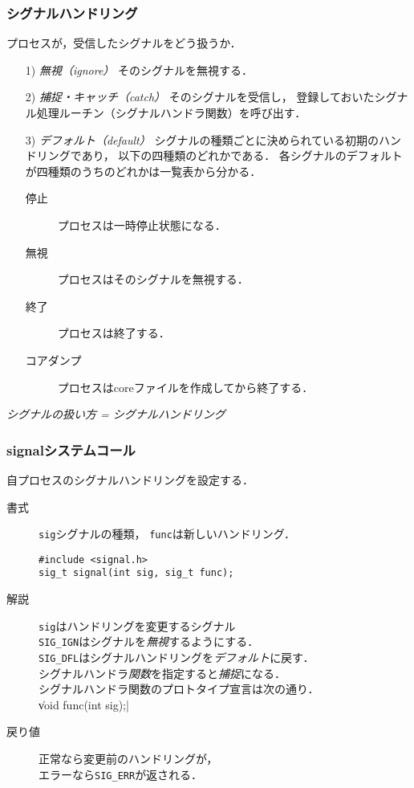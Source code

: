 \documentclass{beamer}                 %
\begin{document}
\begin{frame}[fragile]
  \frametitle{シグナルハンドリング}
  プロセスが，受信したシグナルをどう扱うか．

  \begin{enumerate}
  \item[1)] \emph{無視（ignore）}
    そのシグナルを無視する．
  \item[2)] \emph{捕捉・キャッチ（catch）}
    そのシグナルを受信し，
    登録しておいたシグナル処理ルーチン（シグナルハンドラ関数）を呼び出す．
  \item[3)] \emph{デフォルト（default）}
    シグナルの種類ごとに決められている初期のハンドリングであり，
    以下の四種類のどれかである．
    各シグナルのデフォルトが四種類のうちのどれかは一覧表から分かる．
    \begin{description}
    \item[停止] プロセスは一時停止状態になる．
    \item[無視] プロセスはそのシグナルを無視する．
    \item[終了] プロセスは終了する．
    \item[コアダンプ] プロセスはcoreファイルを作成してから終了する．
  \end{description}
  \end{enumerate}

  \begin{center}
  \emph{\Large{シグナルの扱い方 = シグナルハンドリング}}
  \end{center}

\end{frame}

\begin{frame}[fragile]
  \frametitle{signalシステムコール}
  自プロセスのシグナルハンドリングを設定する．
  
  \begin{description}
  \item[書式] \texttt{sig}シグナルの種類，
    \texttt{func}は新しいハンドリング．

\begin{verbatim}
#include <signal.h>
sig_t signal(int sig, sig_t func);
\end{verbatim}

  \item[解説] \texttt{sig}はハンドリングを変更するシグナル\\
    \texttt{SIG\_IGN}はシグナルを\emph{無視}するようにする．\\
    \texttt{SIG\_DFL}はシグナルハンドリングを\emph{デフォルト}に戻す．\\
    シグナルハンドラ\emph{関数}を指定すると\emph{捕捉}になる．\\
    シグナルハンドラ関数のプロトタイプ宣言は次の通り．\\
    \|void func(int sig);|

  \item[戻り値] 正常なら変更前のハンドリングが，\\
    エラーなら\texttt{SIG\_ERR}が返される．
  \end{description}
\end{frame}
\end{document}
